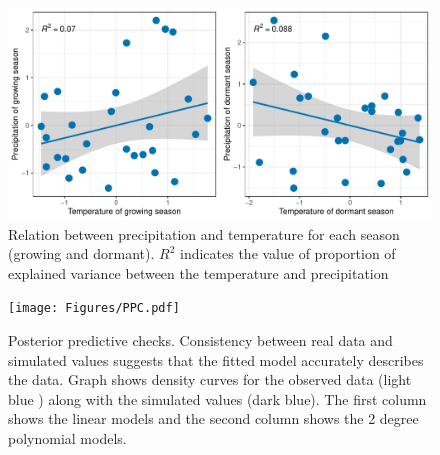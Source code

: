 \documentclass[12pt]{article}
\begin{document}
\begin{figure}[H]
		\centering
		\includegraphics[width=0.95\linewidth]{Figures/Varianceexplained.pdf}
		\caption{Relation between precipitation and temperature for each season (growing and dormant). $R^2$ indicates the value of proportion of explained variance between the temperature and precipitation}
		\label{Sup:Correlation}
\end{figure}
	
\begin{figure}[H]
		\centering
		\texttt{[image: Figures/PPC.pdf]}
		\caption{Posterior predictive checks. Consistency between real data and simulated values suggests that the fitted model accurately describes the data. Graph shows density curves for the observed data (light blue ) along with the simulated values (dark blue). The first column shows the linear models and the second column shows the 2 degree polynomial models.}
		\label{Sup:PPC}
	\end{figure}
	
\end{document}
